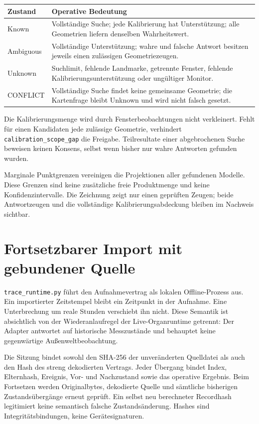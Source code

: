 \documentclass[11pt,a4paper]{article}
\newcommand{\nextsection}[2]{\clearpage{\color{accent}\small\textsf{#1}}\section{#2}}
\begin{document}
\begin{tabularx}{\linewidth}{@{}lY@{}}\toprule
Zustand & Operative Bedeutung\\\midrule
Known & Vollständige Suche; jede Kalibrierung hat Unterstützung;
 alle Geometrien liefern denselben Wahrheitswert.\\
Ambiguous & Vollständige Unterstützung; wahre und falsche
 Antwort besitzen jeweils einen zulässigen Geometriezeugen.\\
Unknown & Suchlimit, fehlende Landmarke, getrennte Fenster,
 fehlende Kalibrierungsunterstützung oder ungültiger Monitor.\\
CONFLICT & Vollständige Suche findet keine gemeinsame Geometrie;
 die Kartenfrage bleibt Unknown und wird nicht falsch gesetzt.\\\bottomrule
\end{tabularx}

Die Kalibrierungsmenge wird durch Fensterbeobachtungen nicht
verkleinert. Fehlt für einen Kandidaten jede zulässige Geometrie,
verhindert \texttt{calibration\_scope\_gap} die Freigabe.
Teilresultate einer abgebrochenen Suche beweisen keinen Konsens,
selbst wenn bisher nur wahre Antworten gefunden wurden.

Marginale Punktgrenzen vereinigen die Projektionen aller
gefundenen Modelle. Diese Grenzen sind keine zusätzliche freie
Produktmenge und keine Konfidenzintervalle. Die Zeichnung zeigt
nur einen geprüften Zeugen; beide Antwortzeugen und die vollständige
Kalibrierungsabdeckung bleiben im Nachweis sichtbar.

\nextsection{69 / AUFNAHMEZEIT UND REPLAY}{Fortsetzbarer Import mit gebundener Quelle}
\texttt{trace\_runtime.py} führt den Aufnahmevertrag als lokalen
Offline-Prozess aus. Ein importierter Zeitstempel bleibt ein
Zeitpunkt in der Aufnahme. Eine Unterbrechung um reale Stunden
verschiebt ihn nicht. Diese Semantik ist absichtlich von der
Wiederanlaufregel der Live-Organruntime getrennt: Der Adapter
antwortet auf historische Messzustände und behauptet keine
gegenwärtige Außenweltbeobachtung.

Die Sitzung bindet sowohl den SHA-256 der unveränderten
Quelldatei als auch den Hash des streng dekodierten Vertrags.
Jeder Übergang bindet Index, Elternhash, Ereignis, Vor- und
Nachzustand sowie das operative Ergebnis. Beim Fortsetzen werden
Originalbytes, dekodierte Quelle und sämtliche bisherigen
Zustandsübergänge erneut geprüft. Ein selbst neu berechneter
Recordhash legitimiert keine semantisch falsche Zustandsänderung.
Hashes sind Integritätsbindungen, keine Gerätesignaturen.
\end{document}
